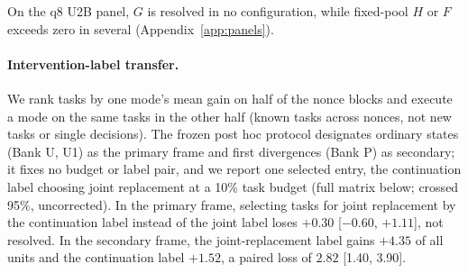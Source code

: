 On the q8 U2B panel, $G$ is resolved in no configuration, while fixed-pool $H$ or $F$ exceeds zero in several (Appendix~\ref{app:panels}). %


\paragraph{Intervention-label transfer.} We rank tasks by one mode's mean gain on half of the nonce blocks and execute a mode on the same tasks in the other half (known tasks across nonces, not new tasks or single decisions). The frozen post hoc protocol designates ordinary states (Bank U, U1) as the primary frame and first divergences (Bank P) as secondary; it fixes no budget or label pair, and we report one selected entry, the continuation label choosing joint replacement at a 10\% task budget (full matrix below; crossed 95\%, uncorrected). In the primary frame, selecting tasks for joint replacement by the continuation label instead of the joint label loses $+0.30$\pp{} [$-0.60$, $+1.11$], not resolved. In the secondary frame, the joint-replacement label gains $+4.35$\pp{} of all units and the continuation label $+1.52$\pp{}, a paired loss of $2.82$\pp{} [1.40, 3.90]. %


